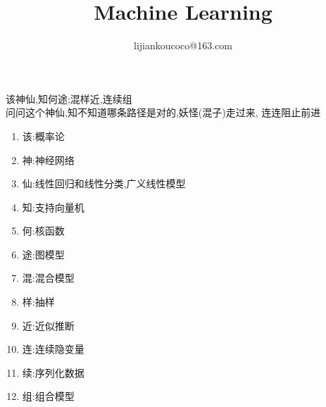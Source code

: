 \documentclass[graybox, envcountchap]{styles/svmult}
\author{lijiankoucoco@163.com}
\title{Machine Learning}
\begin{document}
\begin{CJK}{UTF8}{gkai}
\frontmatter%


\tableofcontents

\mainmatter%
该神仙,知何途;混样近,连续组\\
问问这个神仙,知不知道哪条路径是对的,妖怪(混子)走过来,
连连阻止前进
\begin{enumerate}
\item 该:概率论
\item 神:神经网络
\item 仙:线性回归和线性分类,广义线性模型
\item 知:支持向量机
\item 何:核函数
\item 途:图模型
\item 混:混合模型
\item 样:抽样
\item 近:近似推断
\item 连:连续隐变量
\item 续:序列化数据
\item 组:组合模型
\end{enumerate}

















\backmatter%
\appendix
%

\printindex
\clearpage
\end{CJK}



\end{document}
